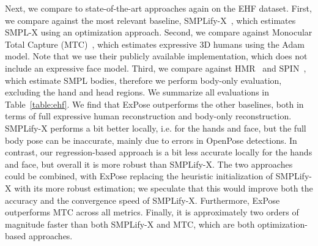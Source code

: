 \documentclass[runningheads]{llncs}
\newcommand{\modelname}{\mbox{ExPose}\xspace}
\newcommand{\spin}{\mbox{SPIN}\xspace}
\newcommand{\smplx}{\mbox{SMPL-X}\xspace}
\newcommand{\smplifyx}{\mbox{SMPLify-X}\xspace}
\newcommand{\adam}{\mbox{Adam}\xspace}
\newcommand{\smpl}{\mbox{SMPL}\xspace}
\newcommand{\threeD}{3D\xspace}
\newcommand{\mtc}{\mbox{MTC}\xspace}
\newcommand{\ie}{i.e.\xspace}
\begin{document}
 
Next,   we compare to state-of-the-art approaches again on the EHF dataset.
First, we compare against the most relevant baseline,
\smplifyx~\cite{Pavlakos_2019_CVPR}, which estimates \smplx using an
optimization approach.
Second, we compare against Monocular Total Capture
(\mtc)~\cite{Xiang_2019_CVPR}, which estimates expressive \threeD
humans using the \adam model.
Note that we use their publicly available implementation, which
does not include an expressive face model.
Third,  we compare against HMR~\cite{kanazawa_cvpr_2018} and
\spin~\cite{Kolotouros_2019_ICCV}, which estimate \smpl bodies,
therefore we perform body-only evaluation, excluding the hand and head regions.
We summarize all evaluations in Table~\ref{table:ehf}. We find that \modelname outperforms the other baselines, both in terms of full expressive human reconstruction and body-only reconstruction.
\smplifyx performs a bit better locally, \ie for the hands and face, but the full body pose can be inaccurate, mainly due to errors in OpenPose detections.  In contrast, our regression-based approach is a bit less accurate locally for the hands and face, but overall it is more robust than \smplifyx. The two approaches could be combined, with \modelname replacing the
heuristic initialization of \smplifyx with its more robust estimation;
we speculate that this would improve both the accuracy and the convergence speed of \smplifyx.
Furthermore, \modelname outperforms \mtc across all metrics.
Finally, it is approximately two orders of magnitude faster than both \smplifyx and \mtc, which are both optimization-based approaches.
\end{document}
